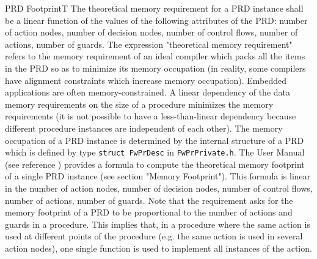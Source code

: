 \documentclass[requirements]{../fwprofile}
\begin{document}
\begin{fw_req_note}{PRD Footprint}{T}
{The theoretical memory requirement for a PRD instance shall 
be a linear function of the values of the following attributes 
of the PRD: number of action nodes, number of decision nodes, number of control flows, 
number of actions, number of guards.}
{The expression "theoretical memory requirement" refers to the memory requirement 
of an ideal compiler which packs all the items in the PRD so as to minimize its memory 
occupation (in reality, some compilers have alignment constraints which increase memory occupation).}
{Embedded applications are often memory-constrained. A linear 
dependency of the data memory requirements on the size of a procedure minimizes 
the memory requirements (it is not possible to have a less-than-linear dependency 
because different procedure instances are independent of each other).}
{The memory occupation of a PRD instance is determined by the 
internal structure of a PRD which is defined by type 
\texttt{struct FwPrDesc} in \texttt{FwPrPrivate.h}.} 
{The User Manual (see reference \cite{ref:um}) provides a formula to compute the theoretical 
memory footprint of a single PRD instance (see section "Memory Footprint"). 
This formula is linear in the number of action nodes, number of decision nodes, number of 
control flows, number of actions, 
number of guards. 
Note that the requirement asks for the memory footprint of a PRD to 
be proportional to the number of actions and guards in a procedure. 
This implies that, in a procedure where the same action is used at different points 
of the procedure (e.g. the same action is used in several action nodes), one 
single function is used to implement all instances of the action.}
\end{fw_req_note}
\end{document}

